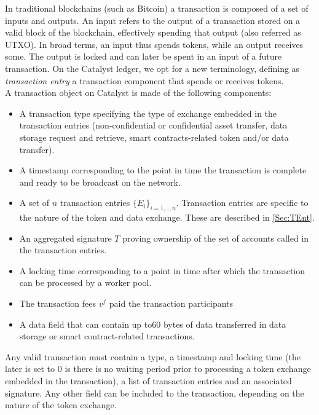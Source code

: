 In traditional blockchains (such as Bitcoin) a transaction is composed of a set of inputs and outputs. An input refers to the output of a transaction stored on a valid block of the blockchain, effectively spending that output (also referred as UTXO). In broad terms, an input thus spends tokens, while an output receives some. The output is locked and can later be spent in an input of a future transaction. On the Catalyst ledger, we opt for a new terminology, defining as \textit{transaction entry} a transaction component that spends or receives tokens.\\

A transaction object on Catalyst is made of the following components:

\begin{itemize}
\item A transaction type specifying the type of exchange embedded in the transaction entries (non-confidential or confidential asset transfer, data storage request and retrieve, smart contracts-related token and/or data transfer).      
\item A timestamp corresponding to the point in time the transaction is complete and ready to be broadcast on the network.
\item A set of $n$ transaction entries $\{E_i\}_{i=1,..,n}$. Transaction entries are specific to the nature of the token and data exchange. These are described in \ref{Sec:TEnt}.
\item An aggregated signature $T$ proving ownership of the set of accounts called in the transaction entries.
\item A locking time corresponding to a point in time after which the transaction can be processed by a worker pool.
\item The transaction fees $v^f$ paid the transaction participants
\item A data field that can contain up to60 bytes of data transferred in data storage or smart contract-related transactions. 
\end{itemize}

Any valid transaction must contain a type, a timestamp and locking time (the later is set to 0 is there is no waiting period prior to processing a token exchange embedded in the transaction), a list of transaction entries and an associated signature. Any other field can be included to the transaction, depending on the nature of the token exchange. 